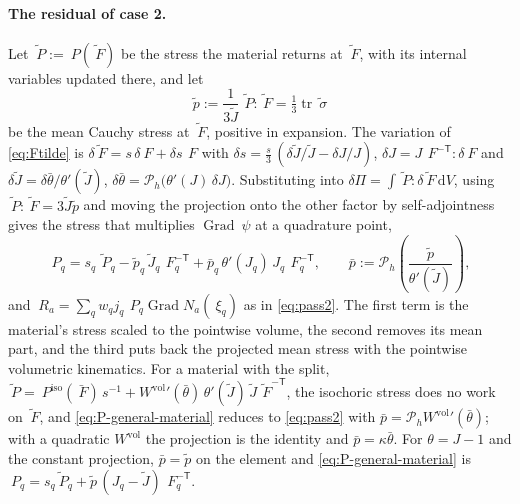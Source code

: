 \documentclass{article}
\newcommand{\F}{~F}
\renewcommand{\P}{~P}
\newcommand{\testd}{~\psi}
\newcommand{\Grad}{\operatorname{Grad}}
\newcommand{\trace}{\operatorname{tr}}
\newcommand{\diff}{\,\mathrm{d}}
\newcommand{\supvol}{^{\mathrm{vol}}}
\newcommand{\supiso}{^{\mathrm{iso}}}
\theoremstyle{definition}
\theoremstyle{plain}
\begin{document}
\paragraph{The residual of case 2.} Let $\tilde{\P} := \P(\tilde{\F})$ be
the stress the material returns at $\tilde{\F}$, with its internal
variables updated there, and let
\begin{equation}
  \label{eq:ptilde}
  \tilde p := \frac{1}{3\tilde J}\, \tilde{\P} : \tilde{\F} = \tfrac13 \trace \tilde{~\sigma}
\end{equation}
be the mean Cauchy stress at $\tilde{\F}$, positive in expansion. The
variation of \eqref{eq:Ftilde} is $\delta\tilde{\F} = s\,\delta\F +
\delta s\,\F$ with $\delta s = \tfrac{s}{3}\,(\delta\tilde J/\tilde J -
\delta J/J)$, $\delta J = J\,\F^{-\mathsf T} : \delta\F$ and
$\delta\tilde J = \delta\bar\theta / \theta'(\tilde J)$, $\delta\bar\theta =
\mathcal{P}_h\big(\theta'(J)\,\delta J\big)$. Substituting into $\delta\Pi
= \int \tilde{\P} : \delta\tilde{\F} \diff V$, using $\tilde{\P} :
\tilde{\F} = 3\tilde J \tilde p$ and moving the projection onto the other
factor by self-adjointness gives the stress that multiplies $\Grad\testd$
at a quadrature point,
\begin{equation}
  \label{eq:P-general-material}
  \P_q = s_q\, \tilde{\P}_q
       - \tilde p_q\, \tilde J_q\, \F_q^{-\mathsf T}
       + \bar p_q\, \theta'(J_q)\, J_q\, \F_q^{-\mathsf T},
  \qquad
  \bar p := \mathcal{P}_h\!\left( \frac{\tilde p}{\theta'(\tilde J)} \right) ,
\end{equation}
and $~R_a = \sum_q w_q j_q\, \P_q \Grad N_a(~\xi_q)$ as in
\eqref{eq:pass2}. The first term is the material's stress scaled to the
pointwise volume, the second removes its mean part, and the third puts back
the projected mean stress with the pointwise volumetric kinematics. For a
material with the split, $\tilde{\P} = \P\supiso(\bar{\F})\,s^{-1} +
W\supvol{}'(\bar\theta)\,\theta'(\tilde J)\,\tilde J\,\tilde{\F}^{-\mathsf T}$,
the isochoric stress does no work on $\tilde{\F}$, and
\eqref{eq:P-general-material} reduces to \eqref{eq:pass2} with $\bar p =
\mathcal{P}_h W\supvol{}'(\bar\theta)$; with a quadratic $W\supvol$ the
projection is the identity and $\bar p = \kappa\bar\theta$. For
$\theta = J - 1$ and the constant projection, $\bar p = \tilde p$ on the
element and \eqref{eq:P-general-material} is $\P_q = s_q \tilde{\P}_q +
\tilde p\,(J_q - \tilde J)\,\F_q^{-\mathsf T}$.
\end{document}
